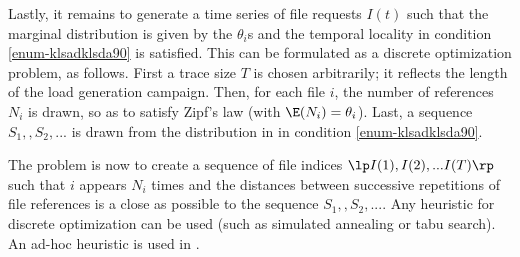 Lastly, it remains to generate a time series of
file requests $I(t)$ such that the marginal
distribution is given by the $\theta_i$s and the
temporal locality in condition
\ref{enum-klsadklsda90} is satisfied. This can be
formulated as a discrete optimization problem, as
follows. First a trace size $T$ is chosen
arbitrarily; it reflects the length of the load
generation campaign. Then, for each file $i$, the
number of references $N_i$ is drawn, so as to
satisfy Zipf's law (with $\E(N_i)=\theta_i$).
Last, a sequence $S_1, , S_2, ...$ is drawn from
the distribution in in condition
\ref{enum-klsadklsda90}.

The problem is now to create a sequence of file
indices $\lp I(1), I(2), ... I(T)\rp$ such that
$i$ appears $N_i$ times and the distances between
successive repetitions of file references is a
close as possible to the sequence $S_1, , S_2,
...$. Any heuristic for discrete optimization can
be used (such as simulated annealing or tabu
search). An ad-hoc heuristic is used in
\cite{surge-98}.%
%





